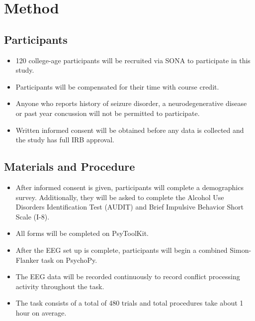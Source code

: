 \section{Method}

\subsection{Participants}
\begin{itemize}
	\item 120 college-age participants will be recruited via SONA to participate in this study.
	\item Participants will be compensated for their time with course credit. 
	\item Anyone who reports history of seizure disorder, a neurodegenerative disease or past year concussion will not be permitted to participate. 
	\item Written informed consent will be obtained before any data is collected and the study has full IRB approval.
\end{itemize}
\subsection{Materials and Procedure}
\begin{itemize}
	\item After informed consent is given, participants will complete a demographics survey. Additionally, they will be asked to complete the Alcohol Use Disorders Identification Test (AUDIT) and Brief Impulsive Behavior Short Scale (I-8).
	\item All forms will be completed on PsyToolKit. 
	\item After the EEG set up is complete, participants will begin a combined Simon-Flanker task on PsychoPy. 
	\item The EEG data will be recorded continuously to record conflict processing activity throughout the task.
	\item The task consists of a total of 480 trials and total procedures take about 1 hour on average.
\end{itemize}
